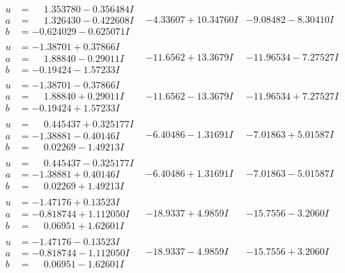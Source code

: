 \documentclass[1p]{elsarticle_modified}
\theoremstyle{definition}
\begin{document}
$$\begin{array}{c|c|c}
\begin{aligned}
u &= \phantom{-}1.353780 - 0.356484 I \\
a &= \phantom{-}1.326430 - 0.422608 I \\
b &= -0.624029 - 0.625071 I\end{aligned}
 & -4.33607 + 10.34760 I & -9.08482 - 8.30410 I \\ \hline\begin{aligned}
u &= -1.38701 + 0.37866 I \\
a &= \phantom{-}1.88840 - 0.29011 I \\
b &= -0.19424 - 1.57233 I\end{aligned}
 & -11.6562 + 13.3679 I & -11.96534 - 7.27527 I \\ \hline\begin{aligned}
u &= -1.38701 - 0.37866 I \\
a &= \phantom{-}1.88840 + 0.29011 I \\
b &= -0.19424 + 1.57233 I\end{aligned}
 & -11.6562 - 13.3679 I & -11.96534 + 7.27527 I \\ \hline\begin{aligned}
u &= \phantom{-}0.445437 + 0.325177 I \\
a &= -1.38881 - 0.40146 I \\
b &= \phantom{-}0.02269 - 1.49213 I\end{aligned}
 & -6.40486 - 1.31691 I & -7.01863 + 5.01587 I \\ \hline\begin{aligned}
u &= \phantom{-}0.445437 - 0.325177 I \\
a &= -1.38881 + 0.40146 I \\
b &= \phantom{-}0.02269 + 1.49213 I\end{aligned}
 & -6.40486 + 1.31691 I & -7.01863 - 5.01587 I \\ \hline\begin{aligned}
u &= -1.47176 + 0.13523 I \\
a &= -0.818744 + 1.112050 I \\
b &= \phantom{-}0.06951 + 1.62601 I\end{aligned}
 & -18.9337 + 4.9859 I & -15.7556 - 3.2060 I \\ \hline\begin{aligned}
u &= -1.47176 - 0.13523 I \\
a &= -0.818744 - 1.112050 I \\
b &= \phantom{-}0.06951 - 1.62601 I\end{aligned}
 & -18.9337 - 4.9859 I & -15.7556 + 3.2060 I \\ \hline\begin{aligned}

\end{aligned}
\end{array}$$
\end{document}
